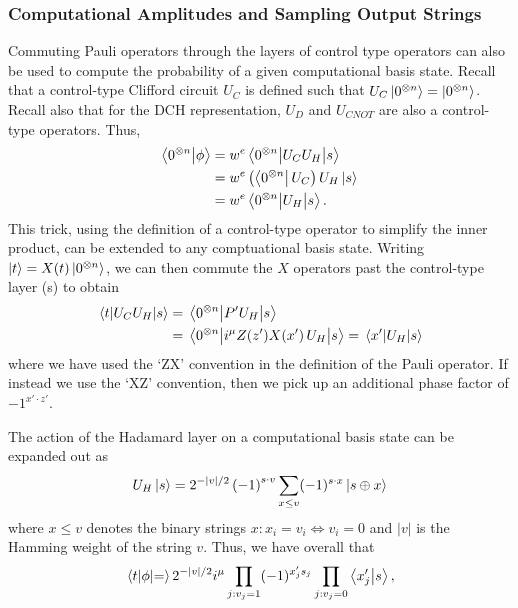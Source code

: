\subsubsection*{Computational Amplitudes and Sampling Output Strings}
Commuting Pauli operators through the layers of control type operators can also be used to compute the probability of a given computational basis state. Recall that a control-type Clifford circuit $U_{C}$ is defined such that $U_{C}\ket{0^{\otimes n}}=\ket{0^{\otimes n}}$. Recall also that for the DCH representation, $U_{D}$ and $U_{CNOT}$ are also a control-type operators. Thus,
\begin{align*}
\braket{0^{\otimes n}}{\phi} &= w^{e}\matrixel{0^{\otimes n}}{U_{C}U_{H}}{s} \nonumber \\
&= w^{e}\left(\bra{0^{\otimes n}}U_{C}\right)U_{H}\ket{s} \nonumber \\
&= w^{e}\matrixel{0^{\otimes n}}{U_{H}}{s}.
\end{align*}
This trick, using the definition of a control-type operator to simplify the inner product, can be extended to any comptuational basis state. Writing $\ket{t}=X(t)\ket{0^{\otimes n}}$, we can then commute the $X$ operators past the control-type layer (s) to obtain
\begin{align}
\matrixel{t}{U_{C}U_{H}}{s} &= \matrixel{0^{\otimes n}}{P'U_{H}}{s} \nonumber \\
&= \matrixel{0^{\otimes n}}{i^{\mu}Z(z')X(x')\,U_{H}}{s} = \matrixel{x'}{U_{H}}{s}
\label{eq:arbitray_computational}
\end{align}
where we have used the `ZX' convention in the definition of the Pauli operator. If instead we use the `XZ' convention, then we pick up an additional phase factor of $-1^{x'\cdot z'}$.\par
The action of the Hadamard layer on a computational basis state can be expanded out as
\begin{equation}
U_{H}\ket{s}=2^{-\left\vert v\right\vert/2}\left(-1\right)^{s\cdot v}\sum_{x\leq v}(-1)^{s\cdot x}\ket{s \oplus x}
\label{eq:hadamard_action}
\end{equation}
where $x\leq v$ denotes the binary strings $x:x_{i}=v_{i}\iff v_{i}=0$ and $\left\vert v\right\vert$ is the Hamming weight of the string $v$. Thus, we have overall that
\begin{equation}
\matrixel{t}{\phi} = 2^{-\left\vert{v}\right\vert /2}i^{\mu}\prod_{j:v_{j}=1}(-1)^{x'_{j}s_{j}}\prod_{j:v_{j}=0}\braket{x'_{j}}{s},
\end{equation}
